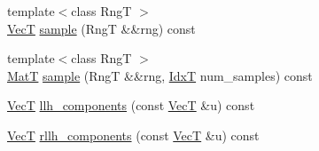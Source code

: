 \begin{DoxyCompactItemize}
{\footnotesize template$<$class RngT $>$ }\\\hyperlink{namespaceprior__hessian_a0b42fc70dec525d83fb2ac155d9ab974}{VecT} \hyperlink{classprior__hessian_1_1CompositeDist_a6ff6939ff00258c150cce9d7dc7153c8}{sample} (RngT \&\&rng) const 
\item 
{\footnotesize template$<$class RngT $>$ }\\\hyperlink{namespaceprior__hessian_aab58331a34ed4ef22b6022564fe74be3}{MatT} \hyperlink{classprior__hessian_1_1CompositeDist_ac4dc4cb08058502dccd79cf7c1480407}{sample} (RngT \&\&rng, \hyperlink{namespaceprior__hessian_aa8d589f74e88bfa3b5750118acd1ab78}{IdxT} num\+\_\+samples) const 
\item 
\hyperlink{namespaceprior__hessian_a0b42fc70dec525d83fb2ac155d9ab974}{VecT} \hyperlink{classprior__hessian_1_1CompositeDist_ad6be77e5400716e31a3ff0327b929787}{llh\+\_\+components} (const \hyperlink{namespaceprior__hessian_a0b42fc70dec525d83fb2ac155d9ab974}{VecT} \&u) const 
\item 
\hyperlink{namespaceprior__hessian_a0b42fc70dec525d83fb2ac155d9ab974}{VecT} \hyperlink{classprior__hessian_1_1CompositeDist_a24bac25ae8c0330b8a3aacadffc9d5ae}{rllh\+\_\+components} (const \hyperlink{namespaceprior__hessian_a0b42fc70dec525d83fb2ac155d9ab974}{VecT} \&u) const 
\end{DoxyCompactItemize}
